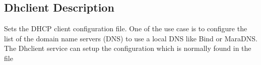 \subsection{Dhclient Description}

Sets the DHCP client configuration file. One of the use case is to
configure the list of the domain name servers (DNS) to use a local DNS like
Bind or MaraDNS. The Dhclient service can setup the configuration which is
normally found in the file 
